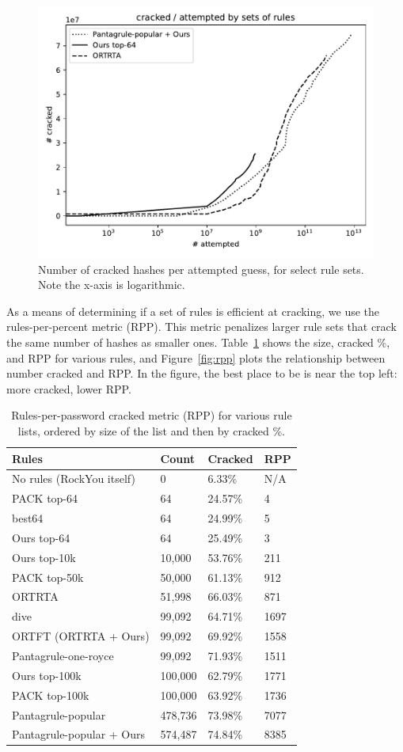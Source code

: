 \documentclass{article}
\begin{document}
\begin{figure}[h!]
\centering
    \includegraphics[width=0.7\linewidth]
    {figures/cracked_attempted_plot_37b49980-a79a-11ed-8986-005056c00001.pdf}
    \caption{Number of cracked hashes per attempted guess, for select rule
sets. Note the x-axis is logarithmic.}
    \label{fig:cracked-attempted}
\end{figure}

As a means of determining if a set of rules is efficient at cracking, we use
the rules-per-percent metric (RPP). This metric penalizes larger rule sets that
crack the same number of hashes as smaller ones. Table~\ref{tab:rpp} shows the
size, cracked \%, and RPP for various rules, and Figure~\ref{fig:rpp} plots the
relationship between number cracked and RPP. In the figure, the best place to
be is near the top left: more cracked, lower RPP.

\begin{table}
\centering
\begin{tabular}{|l|l|l|l|}
  \hline
  Rules & Count & Cracked & RPP \\
  \hline
  No rules (RockYou itself) & 0 & 6.33\% & N/A \\
  PACK top-64 & 64 & 24.57\% & 4 \\
  best64 & 64 & 24.99\% & 5 \\
  Ours top-64 & 64 & 25.49\% & 3 \\
  Ours top-10k & 10,000 & 53.76\% & 211 \\
  PACK top-50k & 50,000 & 61.13\% & 912 \\
  ORTRTA & 51,998 & 66.03\% & 871 \\
  dive & 99,092 & 64.71\% & 1697 \\
  ORTFT (ORTRTA + Ours) & 99,092 & 69.92\% & 1558 \\
  Pantagrule-one-royce & 99,092 & 71.93\% & 1511 \\
  Ours top-100k & 100,000 & 62.79\% & 1771 \\
  PACK top-100k & 100,000 & 63.92\% & 1736 \\
  Pantagrule-popular & 478,736 & 73.98\% & 7077 \\
  Pantagrule-popular + Ours & 574,487 & 74.84\% & 8385 \\
  \hline
\end{tabular}
\caption{Rules-per-password cracked metric (RPP) for various rule lists, ordered
by size of the list and then by cracked \%.}
\label{tab:rpp}
\end{table}
\end{document}
